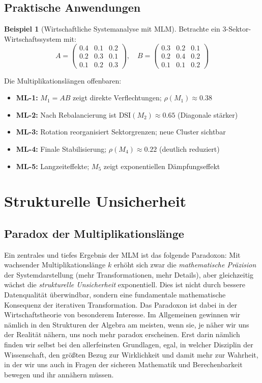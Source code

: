 \documentclass[a4paper,12pt]{article}
\theoremstyle{definition}
\newtheorem{beispiel}{Beispiel}
\begin{document}
\subsection{Praktische Anwendungen}

\begin{beispiel}[Wirtschaftliche Systemanalyse mit MLM]
Betrachte ein 3-Sektor-Wirtschaftssystem mit:
\[
A = \begin{pmatrix} 0.4 & 0.1 & 0.2 \\ 0.2 & 0.3 & 0.1 \\ 0.1 & 0.2 & 0.3 \end{pmatrix}, \quad B = \begin{pmatrix} 0.3 & 0.2 & 0.1 \\ 0.2 & 0.4 & 0.2 \\ 0.1 & 0.1 & 0.2 \end{pmatrix}
\]

Die Multiplikationslängen offenbaren:
\begin{itemize}
\item \textbf{ML-1:} $M_1 = AB$ zeigt direkte Verflechtungen; $\rho(M_1) \approx 0.38$
\item \textbf{ML-2:} Nach Rebalancierung ist $\text{DSI}(M_2) \approx 0.65$ (Diagonale stärker)
\item \textbf{ML-3:} Rotation reorganisiert Sektorgrenzen; neue Cluster sichtbar
\item \textbf{ML-4:} Finale Stabilisierung; $\rho(M_4) \approx 0.22$ (deutlich reduziert)
\item \textbf{ML-5:} Langzeiteffekte; $M_5$ zeigt exponentiellen Dämpfungseffekt
\end{itemize}
\end{beispiel}

\section{Strukturelle Unsicherheit}

\subsection{Paradox der Multiplikationslänge}

Ein zentrales und tiefes Ergebnis der MLM ist das folgende Paradoxon: Mit wachsender Multiplikationslänge $k$ erhöht sich zwar die \emph{mathematische Präzision} der Systemdarstellung (mehr Transformationen, mehr Details), aber gleichzeitig wächst die \emph{strukturelle Unsicherheit} exponentiell. Dies ist nicht durch bessere Datenqualität überwindbar, sondern eine fundamentale mathematische Konsequenz der iterativen Transformation.
Das Paradoxon ist dabei in der Wirtschaftstheorie von besonderem Interesse. Im Allgemeinen gewinnen wir nämlich in den Strukturen der Algebra am meisten, wenn sie, je näher wir uns der Realität nähern, uns noch mehr paradox erscheinen. Erst darin nämlich finden wir selbst bei den allerfeinsten Grundlagen, egal, in welcher Disziplin der Wissenschaft, den größten Bezug zur Wirklichkeit und damit mehr zur Wahrheit, in der wir uns auch in Fragen der sicheren Mathematik und Berechenbarkeit bewegen und ihr annähern müssen.
\end{document}
